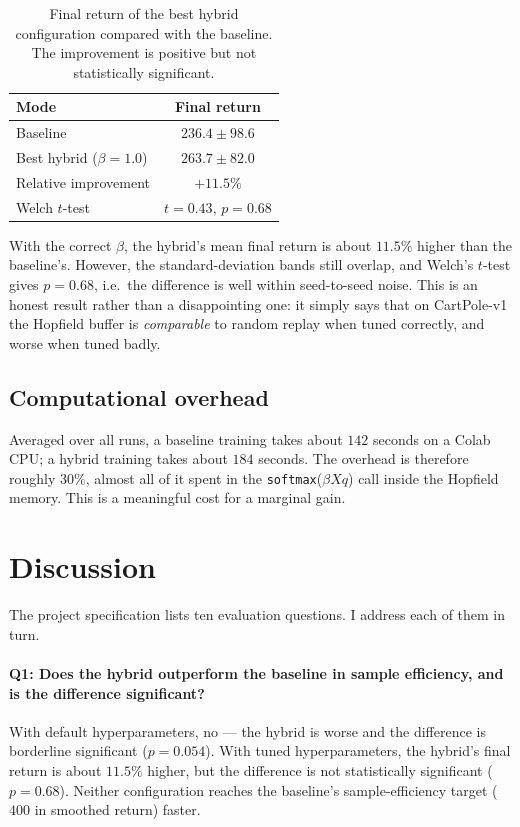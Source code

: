 \documentclass[a4paper,11pt]{article}
\begin{document}
\begin{table}[t]
    \centering
    \begin{tabular}{lc}
        \toprule
        \textbf{Mode} & \textbf{Final return} \\
        \midrule
        Baseline              & $236.4 \pm 98.6$ \\
        Best hybrid ($\beta=1.0$) & $263.7 \pm 82.0$ \\
        \midrule
        Relative improvement   & $+11.5\%$ \\
        Welch $t$-test         & $t=0.43$, $p=0.68$ \\
        \bottomrule
    \end{tabular}
    \caption{Final return of the best hybrid configuration compared with
    the baseline. The improvement is positive but not statistically
    significant.}
    \label{tab:best}
\end{table}

With the correct $\beta$, the hybrid's mean final return is about
$11.5\%$ higher than the baseline's. However, the standard-deviation
bands still overlap, and Welch's $t$-test gives $p=0.68$, i.e.\ the
difference is well within seed-to-seed noise. This is an honest result
rather than a disappointing one: it simply says that on CartPole-v1 the
Hopfield buffer is \emph{comparable} to random replay when tuned
correctly, and worse when tuned badly.

\subsection{Computational overhead}

Averaged over all runs, a baseline training takes about $142$ seconds on
a Colab CPU; a hybrid training takes about $184$ seconds. The overhead
is therefore roughly $30\%$, almost all of it spent in the
\texttt{softmax}($\beta X q$) call inside the Hopfield memory. This is a
meaningful cost for a marginal gain.

\section{Discussion}
\label{sec:discussion}

The project specification lists ten evaluation questions. I address each
of them in turn.

\paragraph{Q1: Does the hybrid outperform the baseline in sample efficiency,
and is the difference significant?}
With default hyperparameters, no --- the hybrid is worse and the
difference is borderline significant ($p=0.054$). With tuned
hyperparameters, the hybrid's final return is about $11.5\%$ higher, but
the difference is not statistically significant ($p=0.68$). Neither
configuration reaches the baseline's sample-efficiency target ($400$ in
smoothed return) faster.
\end{document}
